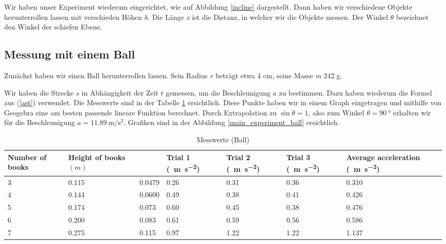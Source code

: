 \documentclass[a4paper, titlepage]{article}
\newcommand{\accunit}[1]{\SI{#1}{\metre\per\square\second}}
\begin{document}
    Wir haben unser Experiment wiederum eingerichtet, wie auf Abbildung
    \ref{incline} dargestellt. Dann haben wir verschiedene Objekte
    herunterrollen lassen mit verschieden Höhen
    \emph{h}. Die Länge \emph{x} ist die Distanz, in welcher
    wir die Objekte messen. Der Winkel $\theta$ bezeichnet
    den Winkel der schiefen Ebene.

    \subsection{Messung mit einem Ball}
    Zunächst haben wir einen Ball herunterrollen lassen.
    Sein Radius \emph{r} beträgt etwa 4 cm, seine Masse
    \emph{m} 242 g.
    
    Wir haben die Strecke $s$ in Abhängigkeit
    der Zeit $t$ gemessen, um die Beschleunigung
    $a$ zu bestimmen. Dazu haben wiederum die Formel
    aus (\ref{ast}) verwendet.
    Die Messwerte sind in der Tabelle \ref{ball}
    ersichtlich. Diese Punkte haben wir in einem
    Graph eingetragen und mithilfe von Geogebra
    eine am besten passende lineare Funktion berechnet.
    Durch Extrapolation zu 
    $\sin{\theta} = 1$, also zum Winkel 
    $\theta = \SI{90}{\degree}$ erhalten wir für
    die Beschleunigung $a = \accunit{11.89}$. Grafiken sind
    in der Abbildung \ref{main_experiment_ball} ersichtlich.

    \begin{table}
        \begin{tabularx}{\textwidth}{|X|X|X|X|X|X|X|}
            \hline
            \textbf{Number of books} & \textbf{Height of books $(m)$} & 
            \boldmath{$\sin{\theta}$} & \textbf{Trial 1}
            (\accunit{}) & 
            \textbf{Trial 2} (\accunit{}) & 
            \textbf{Trial 3} (\accunit{}) & 
            \textbf{Average acceleration} (\accunit{}) \\
            \hline
            3 & 0.115 & 0.0479 & 0.26 & 0.31 & 0.36 & 0.310 \\
            \hline
            4 & 0.144 & 0.0600 & 0.49 & 0.38 & 0.41 & 0.426 \\
            \hline
            5 & 0.174 & 0.073 & 0.60 & 0.45 & 0.38 & 0.476 \\
            \hline
            6 & 0.200 & 0.083 & 0.61 & 0.59 & 0.56 & 0.586 \\
            \hline
            7 & 0.275 & 0.115 & 0.97 & 1.22 & 1.22 & 1.137 \\
            \hline
        \end{tabularx}
        \caption{Messwerte (Ball)}
        \label{ball}
    \end{table}
\end{document}
